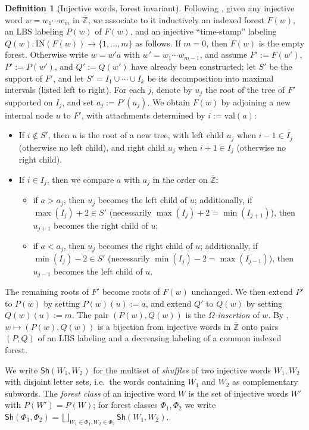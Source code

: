 \documentclass{amsart}
\theoremstyle{definition}
\newtheorem{definition}[lemma]{Definition}
\theoremstyle{remark}
\numberwithin{equation}{subsection}
\begin{document}
\begin{definition}[Injective words, forest invariant]
Following \cite{nadeau2024forest}, given any injective word $w = w_1\cdots w_m$ in $\overline{\mathbb{Z}}$, we associate to it inductively an indexed forest $F(w)$, an LBS labeling $P(w)$ of $F(w)$, and an injective ``time-stamp'' labeling $Q(w):\mathrm{IN}(F(w))\to\{1,\ldots,m\}$ as follows. If $m=0$, then $F(w)$ is the empty forest. Otherwise write $w = w'a$ with $w' = w_1\cdots w_{m-1}$, and assume $F' := F(w')$, $P' := P(w')$, and $Q' := Q(w')$ have already been constructed; let $S'$ be the support of $F'$, and let $S' = I_1\cup\cdots\cup I_k$ be its decomposition into maximal intervals (listed left to right). For each $j$, denote by $u_j$ the root of the tree of $F'$ supported on $I_j$, and set $a_j := P'(u_j)$. We obtain $F(w)$ by adjoining a new internal node $u$ to $F'$, with attachments determined by $i := \mathrm{val}(a)$:
\begin{itemize}
\item If $i\notin S'$, then $u$ is the root of a new tree, with left child $u_j$ when $i-1\in I_j$ (otherwise no left child), and right child $u_j$ when $i+1\in I_j$ (otherwise no right child).
\item If $i\in I_j$, then we compare $a$ with $a_j$ in the order on $\overline{\mathbb{Z}}$:
\begin{itemize}
\item if $a>a_j$, then $u_j$ becomes the left child of $u$; additionally, if $\max(I_j)+2\in S'$ (necessarily $\max(I_j)+2 = \min(I_{j+1})$), then $u_{j+1}$ becomes the right child of $u$;
\item if $a<a_j$, then $u_j$ becomes the right child of $u$; additionally, if $\min(I_j)-2\in S'$ (necessarily $\min(I_j)-2=\max(I_{j-1})$), then $u_{j-1}$ becomes the left child of $u$.
\end{itemize}
\end{itemize}
The remaining roots of $F'$ become roots of $F(w)$ unchanged. We then extend $P'$ to $P(w)$ by setting $P(w)(u) := a$, and extend $Q'$ to $Q(w)$ by setting $Q(w)(u) := m$. The pair $(P(w), Q(w))$ is the \emph{$\Omega$-insertion} of $w$. By \cite[Theorem~5.1]{nadeau2024forest}, $w\mapsto(P(w),Q(w))$ is a bijection from injective words in $\overline{\mathbb{Z}}$ onto pairs $(P,Q)$ of an LBS labeling and a decreasing labeling of a common indexed forest.

We write $\mathsf{Sh}(W_1,W_2)$ for the multiset of \emph{shuffles} of two injective words $W_1,W_2$ with disjoint letter sets, i.e.\ the words containing $W_1$ and $W_2$ as complementary subwords. The \emph{forest class} of an injective word $W$ is the set of injective words $W'$ with $P(W')=P(W)$; for forest classes $\Phi_1,\Phi_2$ we write $\mathsf{Sh}(\Phi_1,\Phi_2)=\bigsqcup_{W_1\in\Phi_1,W_2\in\Phi_2}\mathsf{Sh}(W_1,W_2)$.
\end{definition}
\end{document}
